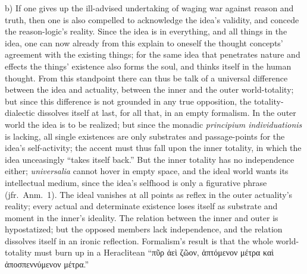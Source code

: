 \documentclass[12pt]{book}
\begin{document}
b) If one gives up the ill-advised undertaking of waging war against reason
and truth, then one is also compelled to acknowledge the idea's validity,
and concede the reason-logic's reality. Since the idea is in everything, and
all things in the idea, one can now already from this explain to oneself the
thought concepts' agreement with the existing things; for the same idea that
penetrates nature and effects the things' existence also forms the soul, and
thinks itself in the human thought. From this standpoint there can thus be
talk of a universal difference between the idea and actuality, between the
inner and the outer world-totality; but since this difference is not
grounded in any true opposition, the totality-dialectic dissolves itself at
last, for all that, in an empty formalism. In the outer world the idea is to
be realized; but since the monadic \textit{principium individuationis} is
lacking, all single existences are only substrates and passage-points for
the idea's self-activity; the accent must thus fall upon the inner totality,
in which the idea unceasingly ``takes itself back.'' But the inner totality
has no independence either; \textit{universalia} cannot hover in empty
space, and the ideal world wants its intellectual medium, since the idea's
selfhood is only a figurative phrase (jfr.\ Anm.\ 1). The ideal vanishes at
all points as reflex in the outer actuality's reality; every actual and
determinate existence loses itself as substrate and moment in the inner's
ideality. The relation between the inner and outer is hypostatized; but the
opposed members lack independence, and the relation dissolves itself in an
ironic reflection. Formalism's result is that the whole world-totality must
burn up in a Heraclitean ``πῦρ ἀεὶ ζῶον, ἁπτόμενον μέτρα καὶ ἀποσπεννύμενον
μέτρα.''
\end{document}
